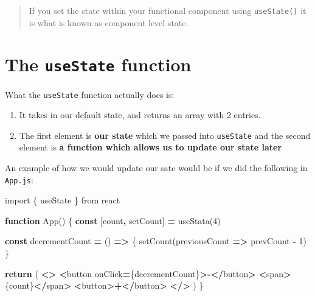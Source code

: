 \documentclass[
]{report}
\newenvironment{Shaded}{\begin{snugshade}}{\end{snugshade}}
\newcommand{\ControlFlowTok}[1]{\textcolor[rgb]{0.13,0.29,0.53}{\textbf{#1}}}
\newcommand{\DecValTok}[1]{\textcolor[rgb]{0.00,0.00,0.81}{#1}}
\newcommand{\FunctionTok}[1]{\textcolor[rgb]{0.00,0.00,0.00}{#1}}
\newcommand{\ImportTok}[1]{#1}
\newcommand{\KeywordTok}[1]{\textcolor[rgb]{0.13,0.29,0.53}{\textbf{#1}}}
\newcommand{\NormalTok}[1]{#1}
\newcommand{\OperatorTok}[1]{\textcolor[rgb]{0.81,0.36,0.00}{\textbf{#1}}}
\newcommand{\StringTok}[1]{\textcolor[rgb]{0.31,0.60,0.02}{#1}}
\providecommand{\tightlist}{%
  \setlength{\itemsep}{0pt}\setlength{\parskip}{0pt}}
\theoremstyle{definition}
\theoremstyle{definition}
\theoremstyle{definition}
\theoremstyle{definition}
\theoremstyle{remark}
\begin{document}
\begin{quote}
If you set the state within your functional component using \texttt{useState()} it is what is known as component level state.
\end{quote}

\hypertarget{the-usestate-function}{%
\section{\texorpdfstring{The \texttt{useState} function}{The useState function}}\label{the-usestate-function}}

What the \texttt{useState} function actually does is:

\begin{enumerate}
\def\labelenumi{\arabic{enumi}.}
\tightlist
\item
  It takes in our default state, and returns an array with 2 entries.
\item
  The first element is \textbf{our state} which we passed into \texttt{useState} and the
  second element is \textbf{a function which allows us to update our state later}
\end{enumerate}

An example of how we would update our sate would be if we did the following in
\texttt{App.js}:

\begin{Shaded}
\begin{Highlighting}[]
\ImportTok{import}\NormalTok{ \{ useState \} }\ImportTok{from} \StringTok{\textquotesingle{}react\textquotesingle{}}

\KeywordTok{function} \FunctionTok{App}\NormalTok{() \{}
    \KeywordTok{const}\NormalTok{ [count}\OperatorTok{,}\NormalTok{ setCount] }\OperatorTok{=} \FunctionTok{useStata}\NormalTok{(}\DecValTok{4}\NormalTok{)}

    \KeywordTok{const}\NormalTok{ decrementCount }\OperatorTok{=}\NormalTok{ () }\KeywordTok{=\textgreater{}}\NormalTok{ \{}
        \FunctionTok{setCount}\NormalTok{(previousCount }\KeywordTok{=\textgreater{}}\NormalTok{ prevCount }\OperatorTok{{-}} \DecValTok{1}\NormalTok{)}
\NormalTok{    \}}

    \ControlFlowTok{return}\NormalTok{ (}
        \OperatorTok{\textless{}\textgreater{}}
            \OperatorTok{\textless{}}\NormalTok{button onClick}\OperatorTok{=}\NormalTok{\{decrementCount\}}\OperatorTok{\textgreater{}{-}\textless{}/}\NormalTok{button}\OperatorTok{\textgreater{}}
            \OperatorTok{\textless{}}\NormalTok{span}\OperatorTok{\textgreater{}}\NormalTok{\{count\}}\OperatorTok{\textless{}/}\NormalTok{span}\OperatorTok{\textgreater{}}
            \OperatorTok{\textless{}}\NormalTok{button}\OperatorTok{\textgreater{}+\textless{}/}\NormalTok{button}\OperatorTok{\textgreater{}}
        \OperatorTok{\textless{}/\textgreater{}}
\NormalTok{    )}
\NormalTok{\}}
\end{Highlighting}
\end{Shaded}
\end{document}
